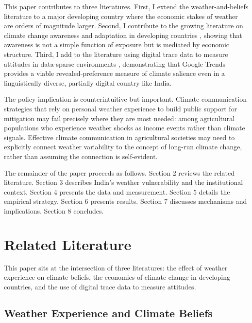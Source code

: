 \documentclass[12pt]{article}
\begin{document}
This paper contributes to three literatures. First, I extend the weather-and-beliefs literature \citep{eganmullin2012, deryugina2013, zaval2014, konisky2016, herrnstadt2014, hazlett2020} to a major developing country where the economic stakes of weather are orders of magnitude larger. Second, I contribute to the growing literature on climate change awareness and adaptation in developing countries \citep{delljonesolen2012, burkeetalwb, bharadwaj2022}, showing that awareness is not a simple function of exposure but is mediated by economic structure. Third, I add to the literature using digital trace data to measure attitudes in data-sparse environments \citep{stephensetal2014, barwick2020, bursztyn2019}, demonstrating that Google Trends provides a viable revealed-preference measure of climate salience even in a linguistically diverse, partially digital country like India.

The policy implication is counterintuitive but important. Climate communication strategies that rely on personal weather experience to build public support for mitigation may fail precisely where they are most needed: among agricultural populations who experience weather shocks as income events rather than climate signals. Effective climate communication in agricultural societies may need to explicitly connect weather variability to the concept of long-run climate change, rather than assuming the connection is self-evident.

The remainder of the paper proceeds as follows. Section 2 reviews the related literature. Section 3 describes India's weather vulnerability and the institutional context. Section 4 presents the data and measurement. Section 5 details the empirical strategy. Section 6 presents results. Section 7 discusses mechanisms and implications. Section 8 concludes.

\section{Related Literature}

This paper sits at the intersection of three literatures: the effect of weather experience on climate beliefs, the economics of climate change in developing countries, and the use of digital trace data to measure attitudes.

\subsection{Weather Experience and Climate Beliefs}
\end{document}
